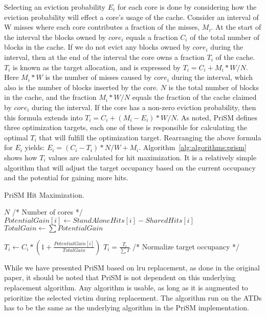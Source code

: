 Selecting an eviction probability $E_i$ for each core is done by considering how the eviction probability will effect a core's usage of the cache.
Consider an interval of W misses where each core contributes a fraction of the misses, $M_i$.
At the start of the interval the blocks owned by $core_i$ equals a fraction $C_i$ of the total number of blocks in the cache.
If we do not evict any blocks owned by $core_i$ during the interval, then at the end of the interval the core owns a fraction $T_i$ of the cache.
$T_i$ is known as the target allocation, and is expressed by $T_i = C_i + M_i * W/N$. 
Here $M_i * W$ is the number of misses caused by $core_i$ during the interval, which also is the number of blocks inserted by the core.
$N$ is the total number of blocks in the cache, and the fraction $M_i * W/N$ equals the fraction of the cache claimed by $core_i$ during the interval.
If the core has a non-zero eviction probability, then this formula extends into $T_i = C_i + (M_i - E_i) * W/N$.
As noted, PriSM defines three optimization targets, each one of these is responsible for calculating the optimal $T_i$ that will fulfill the optimization target.
Rearranging the above formula for $E_i$ yields: $E_i = (C_i - T_i) * N/W + M_i$.
Algorithm~\ref{alg:algorithms:prism} shows how $T_i$ values are calculated for hit maximization.
It is a relatively simple algorithm that will adjust the target occupancy based on the current occupancy and the potential for gaining more hits.

\begin{algorithm}[ht]
\caption{PriSM Hit Maximization.}
\label{alg:algorithms:prism}
\begin{algorithmic}[1]
\State $N$ /* Number of cores */
    \State $PotentialGain[i]\gets StandAloneHits[i] - SharedHits[i]$
\EndFor
\State $TotalGain\gets \sum{PotentialGain}$

    \State $T_i\gets C_i * (1 + \frac{PotentialGain[i]}{TotalGain})$
\EndFor
\State $T_i = \frac{T_i}{\sum{T}}$ /* Normalize target occupancy */
\end{algorithmic}
\end{algorithm}

While we have presented PriSM based on \gls{lru} replacement, as done in the original paper, it should be noted that PriSM is not dependent on this underlying replacement algorithm.
Any algorithm is usable, as long as it is augmented to prioritize the selected victim during replacement.
The algorithm run on the ATDs has to be the same as the underlying algorithm in the PriSM implementation.